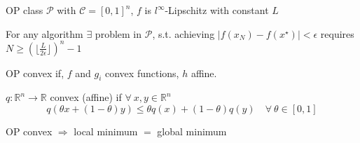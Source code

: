 OP class $\mathcal{P}$ with $\mathcal{C}=[0,1]^n$,
$f$ is $l^\infty$-Lipschitz with constant $L$

\begin{proposition}
	For any algorithm $\exists$ problem in $\mathcal{P}$,
	s.t. achieving $|f(x_N )−f(x^⋆)| < \epsilon$
	requires
	$N \ge (\lfloor\frac{L}{2\epsilon}\rfloor)^n-1$
\end{proposition}

\begin{definition}
	OP convex if, $f$ and $g_i$ convex functions, $h$ affine.
\end{definition}


\begin{definition}
	$q:\mathbb{R}^{n}\rightarrow\mathbb{R}$
	convex (affine) if $\forall\ x, y \in \mathbb{R}^{n}$
	\vspace{-1mm}
	$$q(\theta x+(1−\theta)y)\le\theta q(x)+(1−\theta)q(y)\quad\forall\ \theta \in [0, 1]$$
	\vspace{-3mm}
\end{definition}
\vspace{-1mm}
\begin{proposition}
	OP convex
	$\Rightarrow$
	local minimum $=$ global minimum
\end{proposition}


